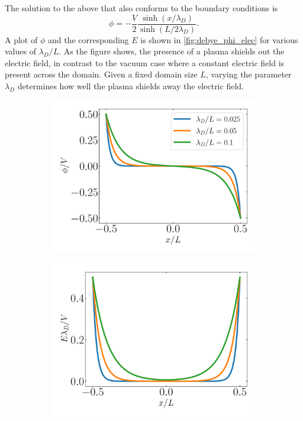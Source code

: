 \documentclass[a4paper,11pt]{report}
\begin{document}
The solution to the above that also conforms to the boundary conditions is
\begin{equation}
    \label{eq:debye_phi_sol}
    \phi = -\frac{V}{2} \frac{\sinh \left( x / \lambda_D \right)}{\sinh \left( L/2\lambda_D \right)}.
\end{equation}
A plot of $\phi$ and the corresponding $E$ is shown in \cref{fig:debye_phi_elec} for various values of $\lambda_D/L$. As the figure shows, the presence of a plasma shields out the electric field, in contrast to the vacuum case where a constant electric field is present across the domain. Given a fixed domain size $L$, varying the parameter $\lambda_D$ determines how well the plasma shields away the electric field. 
\begin{figure}
    \centering
    \begin{subfigure}[b]{0.45\textwidth}
        \centering
        \includegraphics[width=\textwidth]{../../images/debye_phi.pdf}
        \caption{}
        \label{fig:debye_phi}
    \end{subfigure}
    \begin{subfigure}[b]{0.45\textwidth}
        \centering
        \includegraphics[width=\textwidth]{../../images/debye_elec.pdf}

\end{subfigure}
\end{figure}
\end{document}
